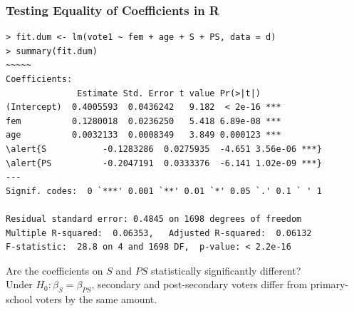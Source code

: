 \documentclass[xcolor=svgnames,9pt,english,aspectratio=169,t]{beamer}
\begin{document}


\begin{frame}[fragile]
\frametitle{Testing Equality of Coefficients in R}

\begin{Verbatim}[fontsize=\footnotesize, frame=single, label=R Code, commandchars=\\\{\}]
> fit.dum <- lm(vote1 ~ fem + age + S + PS, data = d)
> summary(fit.dum)
~~~~~
Coefficients:
              Estimate Std. Error t value Pr(>|t|)
(Intercept)  0.4005593  0.0436242   9.182  < 2e-16 ***
fem          0.1280018  0.0236250   5.418 6.89e-08 ***
age          0.0032133  0.0008349   3.849 0.000123 ***
\alert{S           -0.1283286  0.0275935  -4.651 3.56e-06 ***}
\alert{PS          -0.2047191  0.0333376  -6.141 1.02e-09 ***}
---
Signif. codes:  0 `***' 0.001 `**' 0.01 `*' 0.05 `.' 0.1 ` ' 1

Residual standard error: 0.4845 on 1698 degrees of freedom
Multiple R-squared:  0.06353,	Adjusted R-squared:  0.06132
F-statistic:  28.8 on 4 and 1698 DF,  p-value: < 2.2e-16
\end{Verbatim}
Are the coefficients on $S$ and $PS$ statistically significantly different?\\
{\footnotesize Under $H_0: \beta_S=\beta_{PS}$, secondary and post-secondary voters differ from primary-school voters by the same amount.}
\end{frame}
\end{document}
